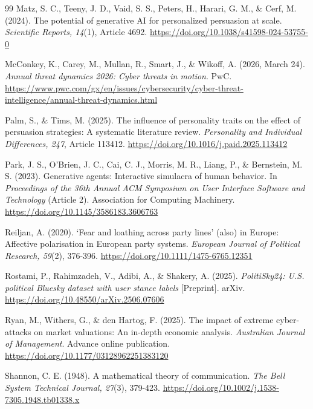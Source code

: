 \documentclass[11pt,a4paper]{article}
\newcommand{\doiurl}[1]{\href{https://doi.org/#1}{https://doi.org/#1}}
\begin{document}
\begin{thebibliography}{99}
Matz, S. C., Teeny, J. D., Vaid, S. S., Peters, H., Harari, G. M., \& Cerf, M. (2024). The
potential of generative AI for personalized persuasion at scale. \textit{Scientific Reports,
14}(1), Article 4692. \doiurl{10.1038/s41598-024-53755-0}

McConkey, K., Carey, M., Mullan, R., Smart, J., \& Wikoff, A. (2026, March 24). \textit{Annual
threat dynamics 2026: Cyber threats in motion}. PwC.
\url{https://www.pwc.com/gx/en/issues/cybersecurity/cyber-threat-intelligence/annual-threat-dynamics.html}

Palm, S., \& Tims, M. (2025). The influence of personality traits on the effect of persuasion
strategies: A systematic literature review. \textit{Personality and Individual Differences, 247},
Article 113412. \doiurl{10.1016/j.paid.2025.113412}

Park, J. S., O'Brien, J. C., Cai, C. J., Morris, M. R., Liang, P., \& Bernstein, M. S. (2023).
Generative agents: Interactive simulacra of human behavior. In \textit{Proceedings of the 36th
Annual ACM Symposium on User Interface Software and Technology} (Article 2). Association for
Computing Machinery. \doiurl{10.1145/3586183.3606763}

Reiljan, A. (2020). `Fear and loathing across party lines' (also) in Europe: Affective
polarisation in European party systems. \textit{European Journal of Political Research, 59}(2),
376-396. \doiurl{10.1111/1475-6765.12351}

Rostami, P., Rahimzadeh, V., Adibi, A., \& Shakery, A. (2025). \textit{PolitiSky24: U.S.
political Bluesky dataset with user stance labels} [Preprint]. arXiv.
\doiurl{10.48550/arXiv.2506.07606}

Ryan, M., Withers, G., \& den Hartog, F. (2025). The impact of extreme cyber-attacks on market
valuations: An in-depth economic analysis. \textit{Australian Journal of Management}. Advance
online publication. \doiurl{10.1177/03128962251383120}

Shannon, C. E. (1948). A mathematical theory of communication. \textit{The Bell System Technical
Journal, 27}(3), 379-423. \doiurl{10.1002/j.1538-7305.1948.tb01338.x}


\end{thebibliography}
\end{document}
